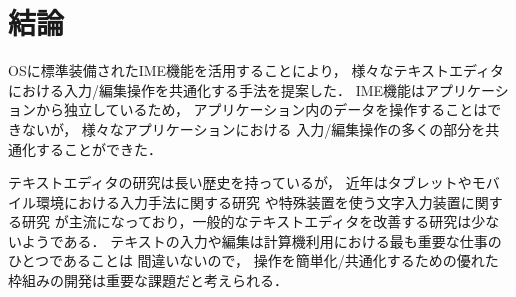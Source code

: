 \section{結論}


OSに標準装備されたIME機能を活用することにより，
様々なテキストエディタにおける入力/編集操作を共通化する手法を提案した．
IME機能はアプリケーションから独立しているため，
アプリケーション内のデータを操作することはできないが，
様々なアプリケーションにおける
入力/編集操作の多くの部分を共通化することができた．
%

テキストエディタの研究は長い歴史を持っているが\cite{texteditors.org}，
近年はタブレットやモバイル環境における入力手法に関する研究%
\cite{Li:1lineKB}%
\cite{MacKenzie:H4Writer}%
\cite{Rick:VirtualKB}%
や特殊装置を使う文字入力装置に関する研究%
\cite{Dietz:PressureKB}%
\cite{Harrison:Skinput}%
\cite{Murase:CameraKB}%
\cite{Wigdor:TiltKB}
が主流になっており，一般的なテキストエディタを改善する研究は少ないようである．
テキストの入力や編集は計算機利用における最も重要な仕事のひとつであることは
間違いないので，
操作を簡単化/共通化するための優れた枠組みの開発は重要な課題だと考えられる．

